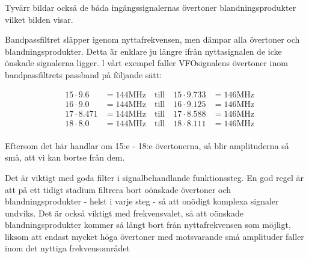 Tyvärr bildar också de båda ingångssignalernas övertoner
blandningsprodukter vilket bilden visar.

Bandpassfiltret släpper igenom nyttafrekvensen, men dämpar alla
övertoner och blandningsprodukter. Detta är enklare ju längre ifrån
nyttasignalen de icke önskade signalerna ligger. l vårt exempel faller
VFOsignalens övertoner inom bandpassfiltrets passband på följande
sätt:

\begin{align*}
  &15 \cdot 9.6   &= 144 \text{MHz} \quad \text{till} \quad 15 \cdot 9.733 &= 146 \text{MHz} \\
  &16 \cdot 9.0   &= 144 \text{MHz} \quad \text{till} \quad 16 \cdot 9.125 &= 146 \text{MHz} \\
  &17 \cdot 8.471 &= 144 \text{MHz} \quad \text{till} \quad 17 \cdot 8.588 &= 146 \text{MHz} \\
  &18 \cdot 8.0   &= 144 \text{MHz} \quad \text{till} \quad 18 \cdot 8.111 &= 146 \text{MHz} \\
\end{align*}


Eftersom det här handlar om 15:e - 18:e övertonerna, så blir
amplituderna så små, att vi kan bortse från dem.

Det är viktigt med goda filter i signalbehandlande funktionssteg. En
god regel är att på ett tidigt stadium filtrera bort oönskade
övertoner och blandningsprodukter - helst i varje steg - så att
onödigt komplexa signaler undviks. Det är också viktigt med
frekvensvalet, så att oönskade blandningsprodukter kommer så långt
bort från nyttafrekvensen som möjligt, liksom att endast mycket höga
övertoner med motsvarande små amplituder faller inom det nyttiga
frekvensområdet
